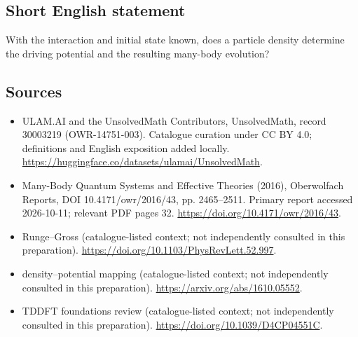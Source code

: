 \documentclass[11pt]{article}
\begin{document}
\subsection{Short English statement}
With the interaction and initial state known, does a particle density determine the driving potential and the resulting many-body evolution?
\subsection{Sources}
\begin{itemize}
\item[\hypertarget{source:30003219:1}{S1}] ULAM.AI and the UnsolvedMath Contributors, UnsolvedMath, record 30003219 (OWR-14751-003). Catalogue curation under CC BY 4.0; definitions and English exposition added locally.
\url{https://huggingface.co/datasets/ulamai/UnsolvedMath}.
\item[\hypertarget{source:30003219:2}{S2}] Many-Body Quantum Systems and Effective Theories (2016), Oberwolfach Reports, DOI 10.4171/owr/2016/43, pp. 2465--2511. Primary report accessed 2026-10-11; relevant PDF pages 32.
\url{https://doi.org/10.4171/owr/2016/43}.
\item[\hypertarget{source:30003219:3}{S3}] Runge--Gross (catalogue-listed context; not independently consulted in this preparation).
\url{https://doi.org/10.1103/PhysRevLett.52.997}.
\item[\hypertarget{source:30003219:4}{S4}] density--potential mapping (catalogue-listed context; not independently consulted in this preparation).
\url{https://arxiv.org/abs/1610.05552}.
\item[\hypertarget{source:30003219:5}{S5}] TDDFT foundations review (catalogue-listed context; not independently consulted in this preparation).
\url{https://doi.org/10.1039/D4CP04551C}.
\end{itemize}
\label{end:30003219}
\end{document}
